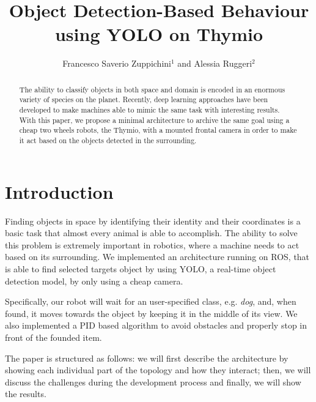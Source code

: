 \documentclass[letterpaper, 10 pt, conference]{ieeeconf}  %
\title{\LARGE \bf
Object Detection-Based Behaviour using YOLO on Thymio
}
\author{Francesco Saverio Zuppichini$^{1}$ and Alessia Ruggeri$^{2}$}%
\begin{document}
\maketitle
\thispagestyle{empty}
\pagestyle{empty}


\begin{abstract}
The ability to classify objects in both space and domain is encoded in an enormous variety of species on the planet. Recently, deep learning approaches have been developed to make machines able to mimic the same task with interesting results. With this paper, we propose a minimal architecture to archive the same goal using a cheap two wheels robots, the Thymio, with a mounted frontal camera in order to make it act based on the objects detected in the surrounding. 
\end{abstract}

\section{Introduction}
Finding objects in space by identifying their identity and their coordinates is a basic task that almost every animal is able to accomplish. The ability to solve this problem is extremely important in robotics, where a machine needs to act based on its surrounding.  We implemented an architecture running on ROS, that is able to find selected targets object by using YOLO, a real-time object detection model,  by only using a cheap camera.

Specifically, our robot will wait for an user-specified class, e.g. \emph{dog}, and, when found, it moves towards the object by keeping it in the middle of its view. We also implemented a PID based algorithm to avoid obstacles and properly stop in front of the founded item.

The paper is structured as follows: we will first describe the architecture by showing each individual part of the topology and how they interact; then, we will discuss the challenges during the development process and finally, we will show the results.
\end{document}
